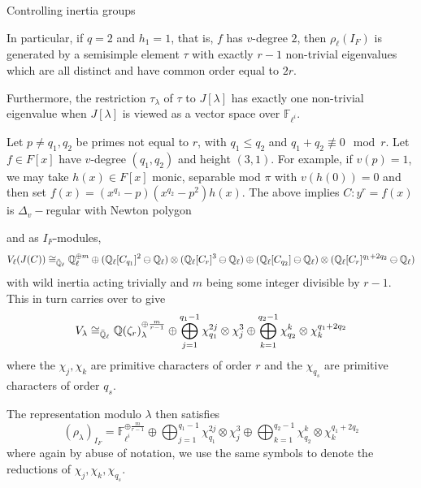 \documentclass[11pt,a4paper]{article}
\newcommand{\Fli}{\mathbb{F}_{\ell^i}}
\newcommand{\Dv}{\Delta_v}
\newcommand{\Qr}{{\QQ(\zeta_r)}}
\begin{document}
\begin{section}{Controlling inertia groups}
\begin{example}
In particular, if $q=2$ and $h_1 =1$, that is, $f$ has $v$-degree $2$, then $\rho_\ell(I_F)$ is generated by a semisimple element $\tau$ with exactly $r-1$ non-trivial eigenvalues which are all distinct and have common order equal to $2r$.

Furthermore, the restriction $\tau_\lambda$ of $\tau$ to $J[\lambda]$ has exactly one non-trivial eigenvalue when $J[\lambda]$  is viewed as a vector space over $\Fli$.
\end{example}

\begin{example}
\label{example_two_primes}
Let $p \neq q_1,q_2$ be primes not equal to $r$, with $q_1 \leq q_2$ and $q_1+q_2 \not \equiv 0 \mod{r}$. Let $f \in F[x]$ have $v$-degree $(q_1,q_2)$ and height $(3,1)$.
For example, if $v(p)=1$, we may take $h(x) \in F[x]$ monic, separable mod $\pi$ with $v\left( h(0) \right) =0$ and then set $f(x) = (x^{q_1}-p)(x^{q_2}-p^2)h(x)$.  The above implies $C\colon y^r=f(x)$ is $\Dv-$regular with Newton polygon
\begin{center}
\end{center}
 and as $I_F$-modules, \[V_\ell(J(C)) \cong_{\Bar{\mathbb{Q}}_\ell}\mathbb{Q}_\ell^{\oplus m} \oplus (\mathbb{Q}_\ell[C_{q_1}]^2 \ominus \mathbb{Q}_\ell)\otimes (\mathbb{Q}_\ell[C_{r}]^{3}  \ominus \mathbb{Q}_\ell) \oplus (\mathbb{Q}_\ell[C_{q_2}] \ominus \mathbb{Q}_\ell)\otimes (\mathbb{Q}_\ell[C_{r}]^{q_1+2q_2}  \ominus \mathbb{Q}_\ell)\]
with wild inertia acting trivially and $m$ being some integer divisible by $r-1$. This in turn carries over to give
\[V_\lambda \cong_{\Bar{\QQ}_\ell} \Qr_{\lambda}^{\oplus \frac{m}{r-1}} \oplus \bigoplus_{j=1}^{q_1-1} \chi_{q_1}^{2j} \otimes \chi_j^{3} \oplus \bigoplus_{k=1}^{q_2-1} \chi_{q_2}^{k} \otimes \chi_k^{q_1+2q_2}\]
where the $\chi_j, \chi_k$ are primitive characters of order $r$ and the $\chi_{q_s}$ are primitive characters of order $q_s$.

The representation modulo $\lambda$ then satisfies
\[ (\rho_\lambda)_{I_F} = \Fli^{\oplus \frac{m}{r-1}} \oplus \bigoplus_{j=1}^{q_1-1} \chi_{q_1}^{2j} \otimes \chi_j^{3} \oplus \bigoplus_{k=1}^{q_2-1} \chi_{q_2}^{k} \otimes \chi_k^{q_1+2q_2}
\]
where again by abuse of notation, we use the same symbols to denote the reductions of $\chi_{j},\chi_k, \chi_{q_s}$.
\end{example}




\end{section}
\end{document}
